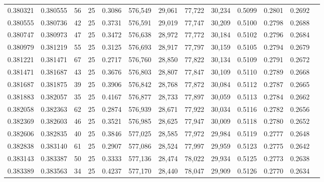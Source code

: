 \begin{tabular}{rrrrrrrrrrrrr}
0.380321 & 0.380555 &    56 &  25 &                                     0.3086 & 576,549 &  29,061 &  77,722 &  30,234 & 0.5099 & 0.2801 & 0.2692 \\
0.380555 & 0.380736 &    42 &  25 &                                     0.3731 & 576,591 &  29,019 &  77,747 &  30,209 & 0.5100 & 0.2798 & 0.2688 \\
0.380747 & 0.380973 &    47 &  25 &                                     0.3472 & 576,638 &  28,972 &  77,772 &  30,184 & 0.5102 & 0.2796 & 0.2684 \\
0.380979 & 0.381219 &    55 &  25 &                                     0.3125 & 576,693 &  28,917 &  77,797 &  30,159 & 0.5105 & 0.2794 & 0.2679 \\
0.381221 & 0.381471 &    67 &  25 &                                     0.2717 & 576,760 &  28,850 &  77,822 &  30,134 & 0.5109 & 0.2791 & 0.2672 \\
0.381471 & 0.381687 &    43 &  25 &                                     0.3676 & 576,803 &  28,807 &  77,847 &  30,109 & 0.5110 & 0.2789 & 0.2668 \\
0.381687 & 0.381875 &    39 &  25 &                                     0.3906 & 576,842 &  28,768 &  77,872 &  30,084 & 0.5112 & 0.2787 & 0.2665 \\
0.381883 & 0.382057 &    35 &  25 &                                     0.4167 & 576,877 &  28,733 &  77,897 &  30,059 & 0.5113 & 0.2784 & 0.2662 \\
0.382058 & 0.382363 &    62 &  25 &                                     0.2874 & 576,939 &  28,671 &  77,922 &  30,034 & 0.5116 & 0.2782 & 0.2656 \\
0.382369 & 0.382603 &    46 &  25 &                                     0.3521 & 576,985 &  28,625 &  77,947 &  30,009 & 0.5118 & 0.2780 & 0.2652 \\
0.382606 & 0.382835 &    40 &  25 &                                     0.3846 & 577,025 &  28,585 &  77,972 &  29,984 & 0.5119 & 0.2777 & 0.2648 \\
0.382838 & 0.383140 &    61 &  25 &                                     0.2907 & 577,086 &  28,524 &  77,997 &  29,959 & 0.5123 & 0.2775 & 0.2642 \\
0.383143 & 0.383387 &    50 &  25 &                                     0.3333 & 577,136 &  28,474 &  78,022 &  29,934 & 0.5125 & 0.2773 & 0.2638 \\
0.383389 & 0.383563 &    34 &  25 &                                     0.4237 & 577,170 &  28,440 &  78,047 &  29,909 & 0.5126 & 0.2770 & 0.2634 \\

\end{tabular}
